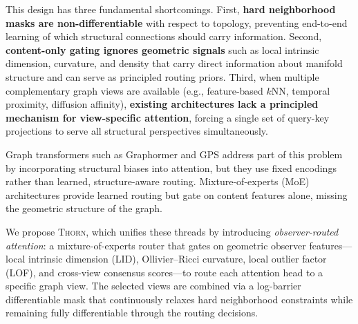 \documentclass[11pt,a4paper]{article}
\newcommand{\thorn}{\textsc{Thorn}}
\begin{document}
This design has three fundamental shortcomings.
First, \textbf{hard neighborhood masks are non-differentiable} with
respect to topology, preventing end-to-end learning of which structural
connections should carry information.
Second, \textbf{content-only gating ignores geometric signals} such as
local intrinsic dimension, curvature, and density that carry direct
information about manifold structure and can serve as principled routing
priors.
Third, when multiple complementary graph views are available (e.g.,
feature-based $k$NN, temporal proximity, diffusion affinity),
\textbf{existing architectures lack a principled mechanism for
view-specific attention}, forcing a single set of query-key projections
to serve all structural perspectives simultaneously.

Graph transformers such as Graphormer \citep{ying2021transformers} and
GPS \citep{rampasek2022recipe} address part of this problem by
incorporating structural biases into attention, but they use fixed
encodings rather than learned, structure-aware routing.
Mixture-of-experts (MoE) architectures
\citep{shazeer2017outrageously, fedus2022switch} provide learned routing
but gate on content features alone, missing the geometric structure of
the graph.

We propose \thorn{}, which unifies these threads by introducing
\emph{observer-routed attention}: a mixture-of-experts router that gates
on geometric observer features---local intrinsic dimension (LID),
Ollivier--Ricci curvature, local outlier factor (LOF), and cross-view
consensus scores---to route each attention head to a specific graph view.
The selected views are combined via a log-barrier differentiable mask
that continuously relaxes hard neighborhood constraints while remaining
fully differentiable through the routing decisions.
\end{document}
